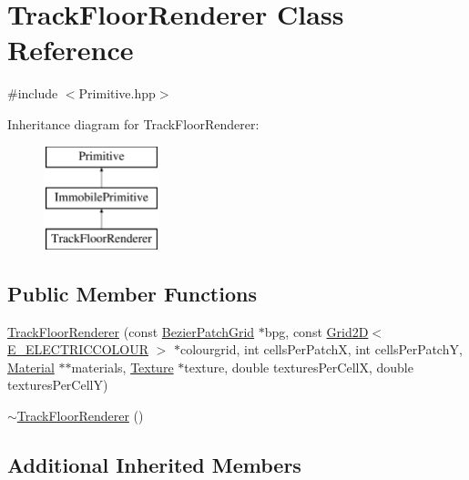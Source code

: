 \hypertarget{class_track_floor_renderer}{\section{Track\-Floor\-Renderer Class Reference}
\label{class_track_floor_renderer}
}


{\ttfamily \#include $<$Primitive.\-hpp$>$}

Inheritance diagram for Track\-Floor\-Renderer\-:\begin{figure}[H]
\begin{center}
\leavevmode
\includegraphics[height=3.000000cm]{class_track_floor_renderer}
\end{center}
\end{figure}
\subsection*{Public Member Functions}
\begin{DoxyCompactItemize}
\item 
\hyperlink{class_track_floor_renderer_a0180ee417454612e322df50801d3b092}{Track\-Floor\-Renderer} (const \hyperlink{class_bezier_patch_grid}{Bezier\-Patch\-Grid} $\ast$bpg, const \hyperlink{class_grid2_d}{Grid2\-D}$<$ \hyperlink{_electric_colour_8hpp_a1979e84576b59c4d100d8a8cc41de734}{E\-\_\-\-E\-L\-E\-C\-T\-R\-I\-C\-C\-O\-L\-O\-U\-R} $>$ $\ast$colourgrid, int cells\-Per\-Patch\-X, int cells\-Per\-Patch\-Y, \hyperlink{class_material}{Material} $\ast$$\ast$materials, \hyperlink{class_texture}{Texture} $\ast$texture, double textures\-Per\-Cell\-X, double textures\-Per\-Cell\-Y)
\item 
\hyperlink{class_track_floor_renderer_aac2d8df7abbc9472c49b9fbfb2221103}{$\sim$\-Track\-Floor\-Renderer} ()
\end{DoxyCompactItemize}
\subsection*{Additional Inherited Members}


